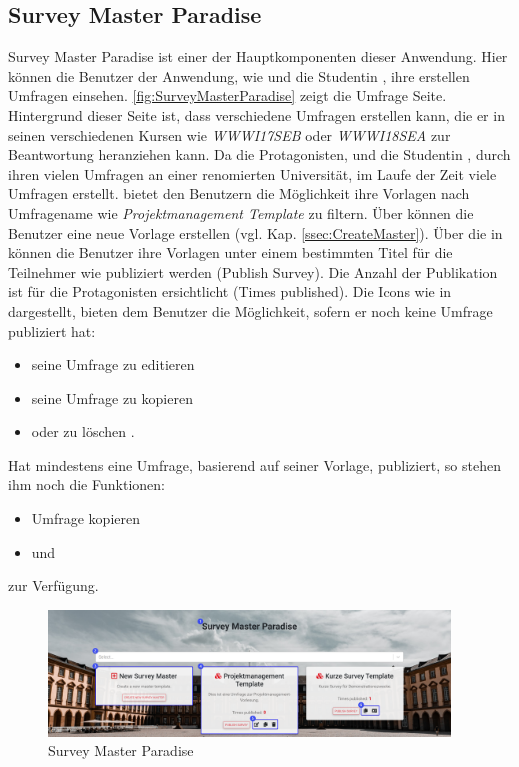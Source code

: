 \subsection{Survey Master Paradise}
\label{ssec:SurveyMasterParadise}
Survey Master Paradise ist einer der Hauptkomponenten dieser Anwendung. 
Hier können die Benutzer der Anwendung, wie \duzi und die Studentin \ariane, ihre erstellen Umfragen einsehen. 
\abb \vref{fig:SurveyMasterParadise} zeigt die Umfrage Seite. 
Hintergrund dieser Seite ist, dass \duzi verschiedene Umfragen erstellen kann, die er in seinen verschiedenen Kursen wie \zb \emph{WWWI17SEB} oder \emph{WWWI18SEA} zur Beantwortung heranziehen kann. %
Da die Protagonisten, \duzi und die Studentin \ariane, durch ihren vielen Umfragen an einer renomierten Universität, im Laufe der Zeit viele Umfragen erstellt. 
\desTwo bietet den Benutzern die Möglichkeit ihre Vorlagen nach Umfragename wie \zb \emph{Projektmanagement Template} zu filtern. 
Über \desThree können die Benutzer eine neue Vorlage erstellen (vgl. Kap. \vref{ssec:CreateMaster}). \newline
Über die in \desFour können die Benutzer ihre Vorlagen unter einem bestimmten Titel für die Teilnehmer wie \weigert publiziert werden (Publish Survey). 
Die Anzahl der Publikation ist für die Protagonisten ersichtlicht (Times published). \newline
Die Icons wie in \desFive dargestellt, bieten dem Benutzer die Möglichkeit, sofern er noch keine Umfrage publiziert hat:
% 
\begin{itemize}
    \item seine Umfrage zu editieren \faEdit
    \item seine Umfrage zu kopieren \faCopy
    \item oder zu löschen \faTrash.
\end{itemize}
% 
Hat \zb \duzi mindestens eine Umfrage, basierend auf seiner Vorlage, publiziert, so stehen ihm noch die Funktionen:
\begin{itemize}
    \item Umfrage kopieren \faCopy
    \item und \faIdCard
\end{itemize} 

zur Verfügung. 

\begin{figure}[H]
	\centering
	\includegraphics[width=0.95\textwidth, keepaspectratio]{img/guide/SurveyMasterParadise.png}
	\captionsetup{justification=centering, format=plain}
	\caption[Survey Master Paradise]{Survey Master Paradise \\\quelleScreenshot}
	\label{fig:SurveyMasterParadise}
\end{figure}

